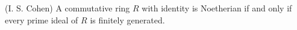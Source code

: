 (I. S. Cohen) A commutative ring $R$ with identity is Noetherian if and only if every prime ideal of $R$ is finitely generated.

